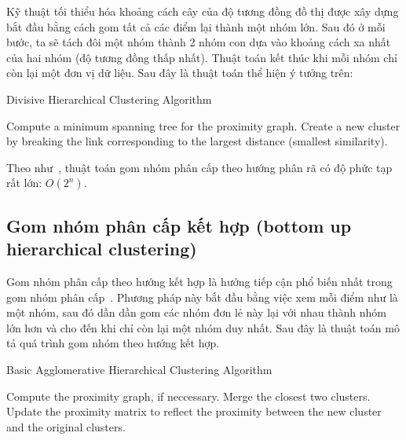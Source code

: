 Kỹ thuật tối thiểu hóa khoảng cách cây của độ tương đồng đồ thị được xây dựng bắt đầu bằng cách gom tất cả các điểm lại thành một nhóm lớn.
Sau đó ở mỗi bước, ta sẽ tách đôi một nhóm thành 2 nhóm con dựa vào khoảng cách xa nhất của hai nhóm (độ tương đồng thấp nhất).
Thuật toán kết thúc khi mỗi nhóm chỉ còn lại một đơn vị dữ liệu.
Sau đây là thuật toán thể hiện ý tưởng trên:

\begin{algorithm}
\caption{Divisive Hierarchical Clustering Algorithm}
\label{alg:Divisive}
\begin{algorithmic}[1]
\State Compute a minimum spanning tree for the proximity graph.
\Repeat
\State Create a new cluster by breaking the link corresponding to the largest distance (smallest similarity).
\end{algorithmic}
\end{algorithm}

Theo như~\cite{wiki-HAC}, thuật toán gom nhóm phân cấp theo hướng phân rã có độ phức tạp rất lớn: $O(2^n)$.

		
		
\subsection{Gom nhóm phân cấp kết hợp (bottom up hierarchical clustering)}
\label{sec:htctt}
Gom nhóm phân cấp theo hướng kết hợp là hướng tiếp cận phổ biến nhất trong gom nhóm phân cấp~\cite{Vipin-Kumar, hierarchical-clustering, cluster-analysis}.
Phương pháp này bắt đầu bằng việc xem mỗi điểm như là một nhóm, sau đó dần dần gom các nhóm đơn lẻ này lại với nhau thành nhóm lớn hơn và cho đến khi chỉ còn lại một nhóm duy nhất.
Sau đây là thuật toán mô tả quá trình gom nhóm theo hướng kết hợp.

\begin{algorithm}
\caption{Basic Agglomerative Hierarchical Clustering Algorithm}
\label{agl:agglomerative}
\begin{algorithmic}[1]
\State Compute the proximity graph, if neccessary.
\Repeat
\State Merge the closest two clusters.
\State Update the proximity matrix to reflect the proximity between the new cluster and the original clusters.
\end{algorithmic}
\end{algorithm}

